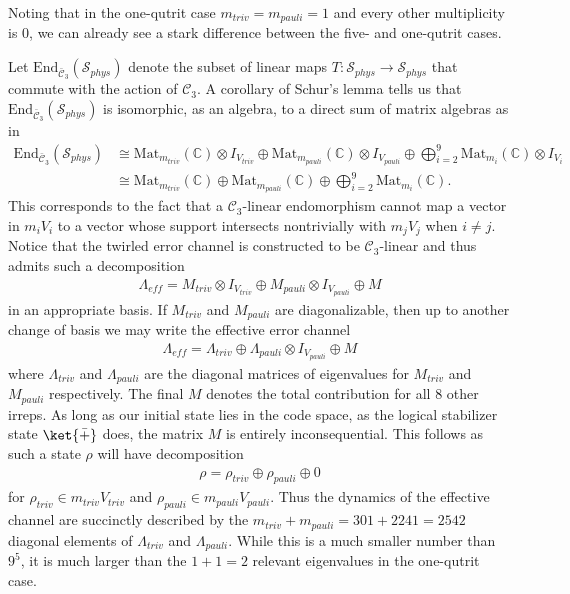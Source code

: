 Noting that in the one-qutrit case $m_{triv} = m_{pauli} = 1$ and every other multiplicity is $0$, we can already see a stark difference between the five- and one-qutrit cases.

Let $\mathrm{End}_{\bar{\mathcal{C}}_3}(\mathcal{S}_{phys})$ denote the subset of linear maps $T : \mathcal{S}_{phys} \to \mathcal{S}_{phys}$ that commute with the action of $\mathcal{C}_3$.
A corollary of Schur's lemma tells us that $\mathrm{End}_{\bar{\mathcal{C}}_3}(\mathcal{S}_{phys})$ is isomorphic, as an algebra, to a direct sum of matrix algebras as in
\begin{align}
    \mathrm{End}_{\bar{\mathcal{C}}_3}(\mathcal{S}_{phys}) &\cong \mathrm{Mat}_{m_{triv}}(\mathbb{C}) \otimes I_{V_{triv}} \oplus \mathrm{Mat}_{m_{pauli}}(\mathbb{C})\otimes I_{V_{pauli}} \oplus \bigoplus_{i = 2}^9 \mathrm{Mat}_{m_i} (\mathbb{C}) \otimes I_{V_i}\\
    &\cong \mathrm{Mat}_{m_{triv}}(\mathbb{C}) \oplus \mathrm{Mat}_{m_{pauli}}(\mathbb{C}) \oplus \bigoplus_{i = 2}^9 \mathrm{Mat}_{m_i}(\mathbb{C}) .
\end{align}
This corresponds to the fact that a $\mathcal{C}_3$-linear endomorphism cannot map a vector in $m_i V_i$ to a vector whose support intersects nontrivially with $m_j V_j$ when $i \neq j$.
Notice that the twirled error channel is constructed to be $\mathcal{C}_3$-linear and thus admits such a decomposition
\begin{align}
    \Lambda_{eff} = M_{triv}\otimes I_{V_{triv}} \oplus M_{pauli} \otimes I_{V_{pauli}} \oplus M
\end{align}
in an appropriate basis.
If $M_{triv}$ and $M_{pauli}$ are diagonalizable, then up to another change of basis we may write the effective error channel
\begin{align}
    \Lambda_{eff} = \Lambda_{triv} \oplus \Lambda_{pauli} \otimes I_{V_{pauli}} \oplus M
\end{align}
where $\Lambda_{triv}$ and $\Lambda_{pauli}$ are the diagonal matrices of eigenvalues for $M_{triv}$ and $M_{pauli}$ respectively.
The final $M$ denotes the total contribution for all $8$ other irreps.
As long as our initial state lies in the code space, as the logical stabilizer state $\ket{\bar{+}}$ does, the matrix $M$ is entirely inconsequential.
This follows as such a state $\rho$ will have decomposition
\begin{align}
    \rho = \rho_{triv} \oplus \rho_{pauli} \oplus 0
\end{align}
for $\rho_{triv} \in m_{triv} V_{triv}$ and $\rho_{pauli} \in m_{pauli}V_{pauli}$.
Thus the dynamics of the effective channel are succinctly described by the $m_{triv} + m_{pauli} = 301 + 2241 = 2542$ diagonal elements of $\Lambda_{triv}$ and $\Lambda_{pauli}$.
While this is a much smaller number than $9^5$, it is much larger than the $1 + 1 = 2$ relevant eigenvalues in the one-qutrit case.

